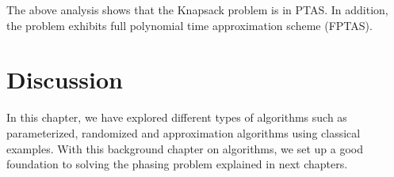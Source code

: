 % 
% 
% 

The above analysis shows that the Knapsack problem is in PTAS. In addition, the problem exhibits full polynomial time approximation scheme (FPTAS).

\section{Discussion}
In this chapter, we have explored different types of algorithms such as parameterized, randomized and approximation algorithms using classical examples.
With this background chapter on algorithms, we set up a good foundation to solving the phasing problem explained in next chapters.

% 
% 

